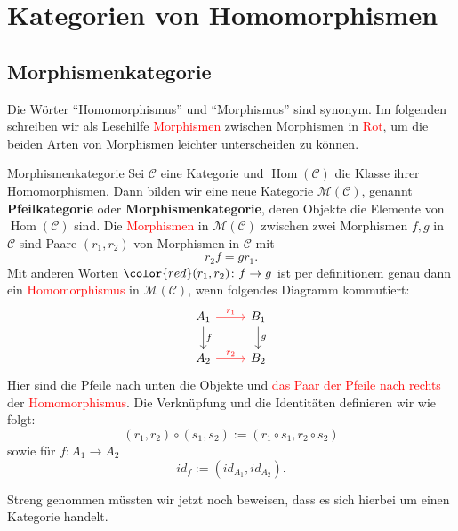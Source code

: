 \documentclass[a4paper]{amsart}
\theoremstyle{definition}
\begin{document}
\section{Kategorien von Homomorphismen}

\subsection{Morphismenkategorie}
Die Wörter "`Homomorphismus"' und "`Morphismus"' sind synonym.
Im folgenden schreiben wir als Lesehilfe \textcolor{red}{Morphismen} zwischen Morphismen in \textcolor{red}{Rot}, um die beiden Arten von Morphismen leichter unterscheiden zu können.

\begin{Definition}{Morphismenkategorie}
   Sei $\mathcal C$ eine Kategorie und $\operatorname{Hom}( \mathcal C )$ die Klasse ihrer Homomorphismen. Dann bilden wir eine neue Kategorie $\mathcal M ( \mathcal C)$, genannt \textbf{Pfeilkategorie} oder \textbf{Morphismenkategorie}, deren Objekte die Elemente von 
   $\operatorname{Hom}( \mathcal C )$ sind. Die \textcolor{red}{Morphismen} in $\mathcal M ( \mathcal C)$ zwischen zwei Morphismen $f, g$ in $\mathcal C$ sind Paare $(r_1, r_2)$ von Morphismen in $\mathcal C$ mit
   \begin{equation*}
      r_2f=gr_1.
   \end{equation*}
   Mit anderen Worten $\color{red}(r_1,r_2) \colon f \to g$ ist per definitionem genau dann ein \textcolor{red}{Homomorphismus} in 
   $\mathcal M ( \mathcal C)$, wenn folgendes Diagramm kommutiert:
   \begin{equation*}
      \begin{tikzcd}
         A_1   \arrow[d, "f"]  \arrow[r, red, "r_1"] & B_1 \arrow[d, "g"]\\
         A_2                   \arrow[r, red, "r_2"] & B_2
      \end{tikzcd}
   \end{equation*}
   Hier sind die Pfeile nach unten die Objekte und \textcolor{red}{das Paar der Pfeile nach rechts} der \textcolor{red}{Homomorphismus}.
   Die Verknüpfung und die Identitäten definieren wir wie folgt:
   \begin{equation*}
      (r_1, r_2)\circ (s_1, s_2) := (r_1 \circ s_1, r_2 \circ s_2 )
   \end{equation*}
   sowie für $f \colon A_1 \to A_2$
   \begin{equation*}
      id_f := ( id_{A_1}, id_{A_2} ).
   \end{equation*}
\end{Definition}
Streng genommen müssten wir jetzt noch beweisen, dass es sich hierbei um einen Kategorie handelt.
\end{document}
